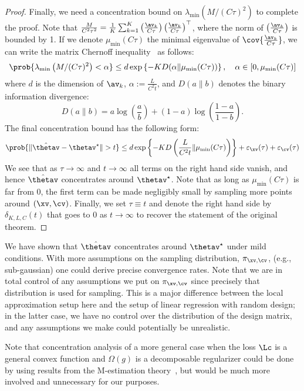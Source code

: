 \documentclass[twoside,11pt]{article}
\begin{document}
\begin{proof}
Finally, we need a concentration bound on $\lambda_\mathrm{min}\left(M / (C \tau)^2\right)$ to complete the proof.
Note that $\frac{M}{C^2\tau^2} = \frac{1}{K} \sum_{k=1}^K \left(\frac{\av_k}{C\tau}\right) \left(\frac{\av_k}{C\tau}\right)^\top$, where the norm of $\left(\frac{\av_k}{C\tau}\right)$ is bounded by 1.
If we denote $\mu_\mathrm{min}(C\tau)$ the minimal eigenvalue of $\cov{\frac{\av_k}{C\tau}}$, we can write the matrix Chernoff inequality~\citep{tropp2012user} as follows:
\begin{equation*}
    \prob{\lambda_\mathrm{min}\left(M / (C \tau)^2\right) < \alpha} \leq d \exp\left\{-K D(\alpha \| \mu_\mathrm{min}(C\tau))\right\}, \quad \alpha \in [0, \mu_\mathrm{min}(C\tau)]
\end{equation*}
where $d$ is the dimension of $\av_k$, $\alpha := \frac{L}{C^2 t}$, and $D(a\|b)$ denotes the binary information divergence:
\begin{equation*}
    D(a\|b) = a\log\left(\frac{a}{b}\right) + (1 - a)\log\left(\frac{1 - a}{1 - b}\right).
\end{equation*}
The final concentration bound has the following form:
\begin{equation}
    \prob{\|\hat\thetav - \thetav^\star\| > t} \leq d \exp\left\{-K D\left(\frac{L}{C^2 t} \| \mu_\mathrm{min}(C\tau)\right)\right\} + \varepsilon_\xv(\tau) + \varepsilon_\cv(\tau)
\end{equation}
We see that as $\tau \rightarrow \infty$ and $t \rightarrow \infty$ all terms on the right hand side vanish, and hence $\hat\thetav$ concentrates around $\thetav^\star$.
Note that as long as $\mu_\mathrm{min}(C\tau)$ is far from 0, the first term can be made negligibly small by sampling more points around $(\xv, \cv)$.
Finally, we set $\tau \equiv t$ and denote the right hand side by $\delta_{K,L,C}(t)$ that goes to 0 as $t \rightarrow \infty$ to recover the statement of the original theorem.
\end{proof}
\begin{remark}
    We have shown that $\hat\thetav$ concentrates around $\thetav^\star$ under mild conditions.
    With more assumptions on the sampling distribution, $\pi_{\xv, \cv}$, (e.g., sub-gaussian) one could derive precise convergence rates.
    Note that we are in total control of any assumptions we put on $\pi_{\xv, \cv}$ since precisely that distribution is used for sampling.
    This is a major difference between the local approximation setup here and the setup of linear regression with random design; in the latter case, we have no control over the distribution of the design matrix, and any assumptions we make could potentially be unrealistic.
\end{remark}
\begin{remark}
    Note that concentration analysis of a more general case when the loss $\Lc$ is a general convex function and $\Omega(g)$ is a decomposable regularizer could be done by using results from the M-estimation theory~\citep{negahban2009unified}, but would be much more involved and unnecessary for our purposes.
\end{remark}
\end{document}
